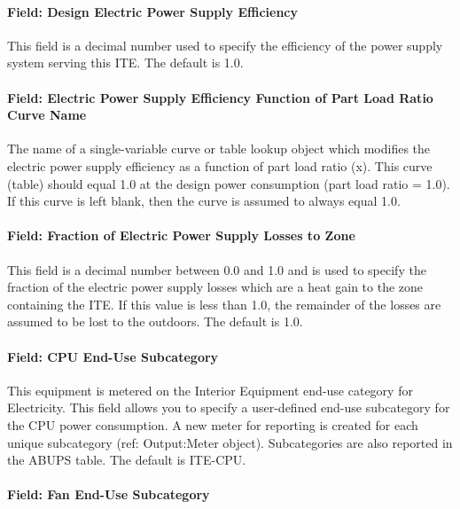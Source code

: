 \paragraph{Field: Design Electric Power Supply Efficiency}\label{field-design-electric-power-supply-efficiency}

This field is a decimal number used to specify the efficiency of the power supply system serving this ITE. The default is 1.0.

\paragraph{Field: Electric Power Supply Efficiency Function of Part Load Ratio Curve Name}\label{field-electric-power-supply-efficiency-function-of-part-load-ratio-curve-name}

The name of a single-variable curve or table lookup object which modifies the electric power supply efficiency as a function of part load ratio (x). This curve (table) should equal 1.0 at the design power consumption (part load ratio = 1.0). If this curve is left blank, then the curve is assumed to always equal 1.0.

\paragraph{Field: Fraction of Electric Power Supply Losses to Zone}\label{field-fraction-of-electric-power-supply-losses-to-zone}

This field is a decimal number between 0.0 and 1.0 and is used to specify the fraction of the electric power supply losses which are a heat gain to the zone containing the ITE. If this value is less than 1.0, the remainder of the losses are assumed to be lost to the outdoors. The default is 1.0.

\paragraph{Field: CPU End-Use Subcategory}\label{field-cpu-end-use-subcategory}

This equipment is metered on the Interior Equipment end-use category for Electricity. This field allows you to specify a user-defined end-use subcategory for the CPU power consumption. A new meter for reporting is created for each unique subcategory (ref: Output:Meter object). Subcategories are also reported in the ABUPS table. The default is ITE-CPU.

\paragraph{Field: Fan End-Use Subcategory}\label{field-fan-end-use-subcategory}

